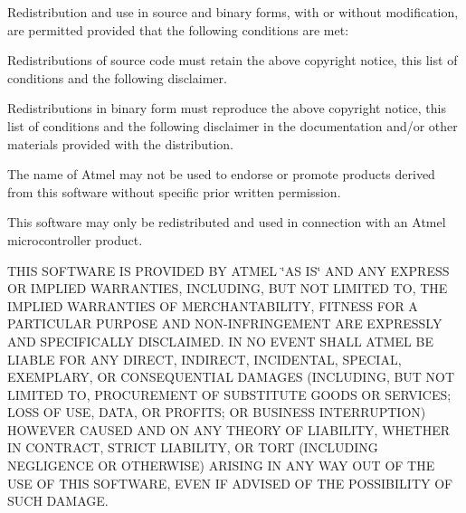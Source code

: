 Redistribution and use in source and binary forms, with or without modification, are permitted provided that the following conditions are met\+:


\begin{DoxyEnumerate}
\item Redistributions of source code must retain the above copyright notice, this list of conditions and the following disclaimer.
\item Redistributions in binary form must reproduce the above copyright notice, this list of conditions and the following disclaimer in the documentation and/or other materials provided with the distribution.
\item The name of Atmel may not be used to endorse or promote products derived from this software without specific prior written permission.
\item This software may only be redistributed and used in connection with an Atmel microcontroller product.
\end{DoxyEnumerate}

T\+H\+I\+S S\+O\+F\+T\+W\+A\+R\+E I\+S P\+R\+O\+V\+I\+D\+E\+D B\+Y A\+T\+M\+E\+L \char`\"{}\+A\+S I\+S\char`\"{} A\+N\+D A\+N\+Y E\+X\+P\+R\+E\+S\+S O\+R I\+M\+P\+L\+I\+E\+D W\+A\+R\+R\+A\+N\+T\+I\+E\+S, I\+N\+C\+L\+U\+D\+I\+N\+G, B\+U\+T N\+O\+T L\+I\+M\+I\+T\+E\+D T\+O, T\+H\+E I\+M\+P\+L\+I\+E\+D W\+A\+R\+R\+A\+N\+T\+I\+E\+S O\+F M\+E\+R\+C\+H\+A\+N\+T\+A\+B\+I\+L\+I\+T\+Y, F\+I\+T\+N\+E\+S\+S F\+O\+R A P\+A\+R\+T\+I\+C\+U\+L\+A\+R P\+U\+R\+P\+O\+S\+E A\+N\+D N\+O\+N-\/\+I\+N\+F\+R\+I\+N\+G\+E\+M\+E\+N\+T A\+R\+E E\+X\+P\+R\+E\+S\+S\+L\+Y A\+N\+D S\+P\+E\+C\+I\+F\+I\+C\+A\+L\+L\+Y D\+I\+S\+C\+L\+A\+I\+M\+E\+D. I\+N N\+O E\+V\+E\+N\+T S\+H\+A\+L\+L A\+T\+M\+E\+L B\+E L\+I\+A\+B\+L\+E F\+O\+R A\+N\+Y D\+I\+R\+E\+C\+T, I\+N\+D\+I\+R\+E\+C\+T, I\+N\+C\+I\+D\+E\+N\+T\+A\+L, S\+P\+E\+C\+I\+A\+L, E\+X\+E\+M\+P\+L\+A\+R\+Y, O\+R C\+O\+N\+S\+E\+Q\+U\+E\+N\+T\+I\+A\+L D\+A\+M\+A\+G\+E\+S (I\+N\+C\+L\+U\+D\+I\+N\+G, B\+U\+T N\+O\+T L\+I\+M\+I\+T\+E\+D T\+O, P\+R\+O\+C\+U\+R\+E\+M\+E\+N\+T O\+F S\+U\+B\+S\+T\+I\+T\+U\+T\+E G\+O\+O\+D\+S O\+R S\+E\+R\+V\+I\+C\+E\+S; L\+O\+S\+S O\+F U\+S\+E, D\+A\+T\+A, O\+R P\+R\+O\+F\+I\+T\+S; O\+R B\+U\+S\+I\+N\+E\+S\+S I\+N\+T\+E\+R\+R\+U\+P\+T\+I\+O\+N) H\+O\+W\+E\+V\+E\+R C\+A\+U\+S\+E\+D A\+N\+D O\+N A\+N\+Y T\+H\+E\+O\+R\+Y O\+F L\+I\+A\+B\+I\+L\+I\+T\+Y, W\+H\+E\+T\+H\+E\+R I\+N C\+O\+N\+T\+R\+A\+C\+T, S\+T\+R\+I\+C\+T L\+I\+A\+B\+I\+L\+I\+T\+Y, O\+R T\+O\+R\+T (I\+N\+C\+L\+U\+D\+I\+N\+G N\+E\+G\+L\+I\+G\+E\+N\+C\+E O\+R O\+T\+H\+E\+R\+W\+I\+S\+E) A\+R\+I\+S\+I\+N\+G I\+N A\+N\+Y W\+A\+Y O\+U\+T O\+F T\+H\+E U\+S\+E O\+F T\+H\+I\+S S\+O\+F\+T\+W\+A\+R\+E, E\+V\+E\+N I\+F A\+D\+V\+I\+S\+E\+D O\+F T\+H\+E P\+O\+S\+S\+I\+B\+I\+L\+I\+T\+Y O\+F S\+U\+C\+H D\+A\+M\+A\+G\+E.